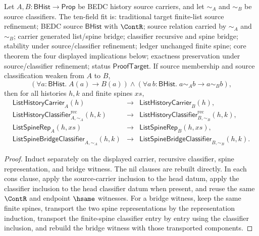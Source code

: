 \begin{theorem}
\label{thm:list-source-classifier-weakening}
Let $A,B:\mathsf{BHist}\to\mathsf{Prop}$ be BEDC history source carriers, and
let $\sim_A$ and $\sim_B$ be source classifiers. The ten-field fit is:
traditional target finite-list source refinement; BEDC source $\mathsf{BHist}$
with $\ContR$; source relation carried by $\sim_A$ and $\sim_B$; carrier
generated list/spine bridge; classifier recursive and spine bridge; stability
under source/classifier refinement; ledger unchanged finite spine; core theorem
the four displayed implications below; exactness preservation under
source/classifier refinement; status $\mathsf{ProofTarget}$. If source
membership and source classification weaken from $A$ to $B$,
$$
(\forall a:\mathsf{BHist}.\; A(a)\to B(a))
\land
(\forall a\,b:\mathsf{BHist}.\; a\sim_A b\to a\sim_B b),
$$
then for all histories $h,k$ and finite spines $xs$,
$$
\begin{array}{rcl}
\mathsf{ListHistoryCarrier}_A(h) &\to&
\mathsf{ListHistoryCarrier}_B(h),\\
\mathsf{ListHistoryClassifier}^{\mathrm{rec}}_{A,\sim_A}(h,k) &\to&
\mathsf{ListHistoryClassifier}^{\mathrm{rec}}_{B,\sim_B}(h,k),\\
\mathsf{ListSpineRep}_A(h,xs) &\to& \mathsf{ListSpineRep}_B(h,xs),\\
\mathsf{ListSpineBridgeClassifier}_{A,\sim_A}(h,k) &\to&
\mathsf{ListSpineBridgeClassifier}_{B,\sim_B}(h,k).
\end{array}
$$
\end{theorem}
\begin{proof}
Induct separately on the displayed carrier, recursive classifier, spine
representation, and bridge witness. The nil clauses are rebuilt directly. In
each cons clause, apply the source-carrier inclusion to the head datum, apply the
classifier inclusion to the head classifier datum when present, and reuse the
same $\ContR$ and endpoint $\hsame$ witnesses. For a bridge witness, keep the
same finite spines, transport the two spine representations by the representation
induction, transport the finite-spine classifier entry by entry using the
classifier inclusion, and rebuild the bridge witness with those transported
components.
\end{proof}


